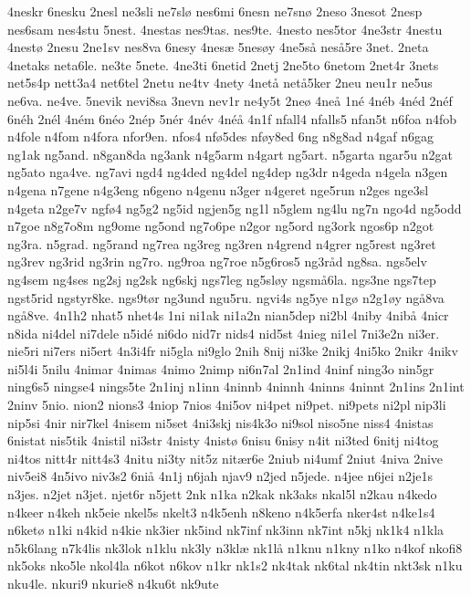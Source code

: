 {4neskr
6nesku
2nesl
ne3sli
ne7sl^^f8
nes6mi
6nesn
ne7sn^^f8
2neso
3nesot
2nesp
nes6sam
nes4stu
5nest.
4nestas
nes9tas.
nes9te.
4nesto
nes5tor
4ne3str
4nestu
4nest^^f8
2nesu
2ne1sv
nes8va
6nesy
4nes^^e6
5nes^^f8y
4ne5s^^e5
nes^^e55re
3net.
2neta
4netaks
neta6le.
ne3te
5nete.
4ne3ti
6netid
2netj
2ne5to
6netom
2net4r
3nets
net5s4p
nett3a4
net6tel
2netu
ne4tv
4nety
4net^^e5
net^^e55ker
2neu
neu1r
ne5us
ne6va.
ne4ve.
5nevik
nevi8sa
3nevn
nev1r
ne4y5t
2ne^^f8
4ne^^e5
1n^^e9
4n^^e9b
4n^^e9d
2n^^e9f
6n^^e9h
2n^^e9l
4n^^e9m
6n^^e9o
2n^^e9p
5n^^e9r
4n^^e9v
4n^^e9^^e5
4n1f
nfall4
nfalls5
nfan5t
n6foa
n4fob
n4fole
n4fom
n4fora
nfor9en.
nfos4
nf^^f85des
nf^^f8y8ed
6ng
n8g8ad
n4gaf
n6gag
ng1ak
ng5and.
n8gan8da
ng3ank
n4g5arm
n4gart
ng5art.
n5garta
ngar5u
n2gat
ng5ato
nga4ve.
ng7avi
ngd4
ng4ded
ng4del
ng4dep
ng3dr
n4geda
n4gela
n3gen
n4gena
n7gene
n4g3eng
n6geno
n4genu
n3ger
n4geret
nge5run
n2ges
nge3sl
n4geta
n2ge7v
ngf^^f84
ng5g2
ng5id
ngjen5g
ng1l
n5glem
ng4lu
ng7n
ngo4d
ng5odd
n7goe
n8g7o8m
ng9ome
ng5ond
ng7o6pe
n2gor
ng5ord
ng3ork
ngos6p
n2got
ng3ra.
n5grad.
ng5rand
ng7rea
ng3reg
ng3ren
n4grend
n4grer
ng5rest
ng3ret
ng3rev
ng3rid
ng3rin
ng7ro.
ng9roa
ng7roe
n5g6ros5
ng3r^^e5d
ng8sa.
ngs5elv
ng4sem
ng4ses
ng2sj
ng2sk
ng6skj
ngs7leg
ng5sl^^f8y
ngsm^^e56la.
ngs3ne
ngs7tep
ngst5rid
ngstyr8ke.
ngs9t^^f8r
ng3und
ngu5ru.
ngvi4s
ng5ye
n1g^^f8
n2g1^^f8y
ng^^e58va
ng^^e58ve.
4n1h2
nhat5
nhet4s
1ni
ni1ak
ni1a2n
nian5dep
ni2bl
4niby
4nib^^e5
4nicr
n8ida
ni4del
ni7dele
n5id^^e9
ni6do
nid7r
nids4
nid5st
4nieg
ni1el
7ni3e2n
ni3er.
nie5ri
ni7ers
ni5ert
4n3i4fr
ni5gla
ni9glo
2nih
8nij
ni3ke
2nikj
4ni5ko
2nikr
4nikv
ni5l4i
5nilu
4nimar
4nimas
4nimo
2nimp
ni6n7al
2n1ind
4ninf
ning3o
nin5gr
ning6s5
ningse4
nings5te
2n1inj
n1inn
4ninnb
4ninnh
4ninns
4ninnt
2n1ins
2n1int
2ninv
5nio.
nion2
nions3
4niop
7nios
4ni5ov
ni4pet
ni9pet.
ni9pets
ni2pl
nip3li
nip5si
4nir
nir7kel
4nisem
ni5set
4ni3skj
nis4k3o
ni9sol
niso5ne
niss4
4nistas
6nistat
nis5tik
4nistil
ni3str
4nisty
4nist^^f8
6nisu
6nisy
n4it
ni3ted
6nitj
ni4tog
ni4tos
nitt4r
nitt4s3
4nitu
ni3ty
nit5z
nit^^e6r6e
2niub
ni4umf
2niut
4niva
2nive
niv5ei8
4n5ivo
niv3s2
6ni^^e5
4n1j
n6jah
njav9
n2jed
n5jede.
n4jee
n6jei
n2je1s
n3jes.
n2jet
n3jet.
njet6r
n5jett
2nk
n1ka
n2kak
nk3aks
nkal5l
n2kau
n4kedo
n4keer
n4keh
nk5eie
nkel5s
nkelt3
n4k5enh
n8keno
n4k5erfa
nker4st
n4ke1s4
n6ket^^f8
n1ki
n4kid
n4kie
nk3ier
nk5ind
nk7inf
nk3inn
nk7int
n5kj
nk1k4
n1kla
n5k6lang
n7k4lis
nk3lok
n1klu
nk3ly
n3kl^^e6
nk1l^^e5
n1knu
n1kny
n1ko
n4kof
nkofi8
nk5oks
nko5le
nkol4la
n6kot
n6kov
n1kr
nk1s2
nk4tak
nk6tal
nk4tin
nkt3sk
n1ku
nku4le.
nkuri9
nkurie8
n4ku6t
nk9ute
}
